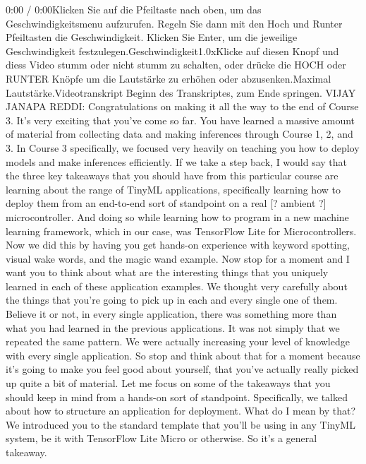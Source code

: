     0:00 / 0:00Klicken Sie auf die Pfeiltaste nach oben, um das Geschwindigkeitsmenu aufzurufen. Regeln Sie dann mit den Hoch und Runter Pfeiltasten die Geschwindigkeit. Klicken Sie Enter, um die jeweilige Geschwindigkeit festzulegen.Geschwindigkeit1.0xKlicke auf diesen Knopf und diess Video stumm oder nicht stumm zu schalten, oder drücke die HOCH oder RUNTER Knöpfe um die Lautstärke zu erhöhen oder abzusenken.Maximal Lautstärke.Videotranskript
    Beginn des Transkriptes, zum Ende springen.
    VIJAY JANAPA REDDI: Congratulations on making
    it all the way to the end of Course 3.
    It's very exciting that you've come so far.
    You have learned a massive amount of material
    from collecting data and making inferences through Course 1, 2, and 3.
    In Course 3 specifically, we focused very heavily
    on teaching you how to deploy models and make inferences efficiently.
    If we take a step back, I would say that the three key takeaways that you should
    have from this particular course are learning
    about the range of TinyML applications, specifically
    learning how to deploy them from an end-to-end sort of standpoint
    on a real [? ambient ?] microcontroller.
    And doing so while learning how to program in a new machine learning
    framework, which in our case, was TensorFlow Lite for Microcontrollers.
    Now we did this by having you get hands-on experience
    with keyword spotting, visual wake words, and the magic wand example.
    Now stop for a moment and I want you to think
    about what are the interesting things that you uniquely learned
    in each of these application examples.
    We thought very carefully about the things
    that you're going to pick up in each and every single one of them.
    Believe it or not, in every single application,
    there was something more than what you had
    learned in the previous applications.
    It was not simply that we repeated the same pattern.
    We were actually increasing your level of knowledge
    with every single application.
    So stop and think about that for a moment
    because it's going to make you feel good about yourself,
    that you've actually really picked up quite a bit of material.
    Let me focus on some of the takeaways that you should keep in mind
    from a hands-on sort of standpoint.
    Specifically, we talked about how to structure
    an application for deployment.
    What do I mean by that?
    We introduced you to the standard template
    that you'll be using in any TinyML system,
    be it with TensorFlow Lite Micro or otherwise.
    So it's a general takeaway.
